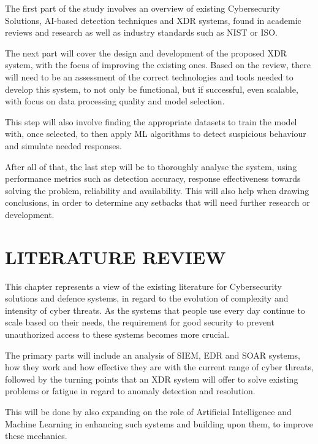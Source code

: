\documentclass[12pt,a4paper]{report}
\begin{document}
The first part of the study involves an overview of existing Cybersecurity Solutions, AI-based
detection techniques and XDR systems, found in academic reviews and research as well as industry
standards such as NIST or ISO.

The next part will cover the design and development of the proposed XDR system, with the focus
of improving the existing ones. Based on the review, there will need to be an assessment of the
correct technologies and tools needed to develop this system, to not only be functional, but if
successful, even scalable, with focus on data processing quality and model selection.

This step will also involve finding the appropriate datasets to train the model with, once
selected, to then apply ML algorithms to detect suspicious behaviour and simulate needed
responses.

After all of that, the last step will be to thoroughly analyse the system, using performance
metrics such as detection accuracy, response effectiveness towards solving the problem,
reliability and availability. This will also help when drawing conclusions, in order to determine
any setbacks that will need further research or development.

\chapter{LITERATURE REVIEW}

This chapter represents a view of the existing literature for Cybersecurity solutions and defence
systems, in regard to the evolution of complexity and intensity of cyber threats. As the systems
that people use every day continue to scale based on their needs, the requirement for good
security to prevent unauthorized access to these systems becomes more crucial.

The primary parts will include an analysis of SIEM, EDR and SOAR systems, how they work and how
effective they are with the current range of cyber threats, followed by the turning points that
an XDR system will offer to solve existing problems or fatigue in regard to anomaly detection and
resolution.

This will be done by also expanding on the role of Artificial Intelligence and Machine Learning
in enhancing such systems and building upon them, to improve these mechanics.
\end{document}
